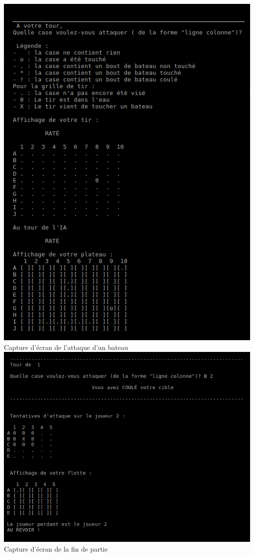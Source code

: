 \documentclass[a4paper,12pt]{article}
\begin{document}
\begin{center}
    \includegraphics[width=1\textwidth] {capture_ecran_attaque_bateau.png}  
    Capture d'écran de l'attaque d'un bateau
    \newpage
    \includegraphics[width=1\textwidth] {capture_ecran_fin_de_jeu.png}  
    Capture d'écran de la fin de partie
\end{center}
\end{document}
